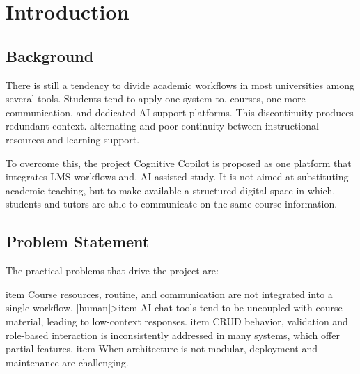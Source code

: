 \chapter{Introduction}

\section{Background}
There is still a tendency to divide academic workflows in most universities among several tools. Students tend to apply one system to.
courses, one more communication, and dedicated AI support platforms. This discontinuity produces redundant context.
alternating and poor continuity between instructional resources and learning support.

To overcome this, the project Cognitive Copilot is proposed as one platform that integrates LMS workflows and.
AI-assisted study. It is not aimed at substituting academic teaching, but to make available a structured digital space in which.
students and tutors are able to communicate on the same course information.
$ $
\section{Problem Statement}
The practical problems that drive the project are:
\begin{enumerate}[label=\arabic*.]
	item Course resources, routine, and communication are not integrated into a single workflow.
	|human|>item AI chat tools tend to be uncoupled with course material, leading to low-context responses.
	item CRUD behavior, validation and role-based interaction is inconsistently addressed in many systems, which offer partial features.
	item When architecture is not modular, deployment and maintenance are challenging.
\end{enumerate}

